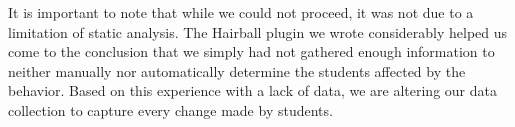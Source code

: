 It is important to note that while we could not proceed, it was not due to a
limitation of static analysis. The Hairball plugin we wrote considerably helped
us come to the conclusion that we simply had not gathered enough information to
neither manually nor automatically determine the students affected by the
\dce{} behavior. Based on this experience with a lack of data, we are altering
our data collection to capture every change made by students.
